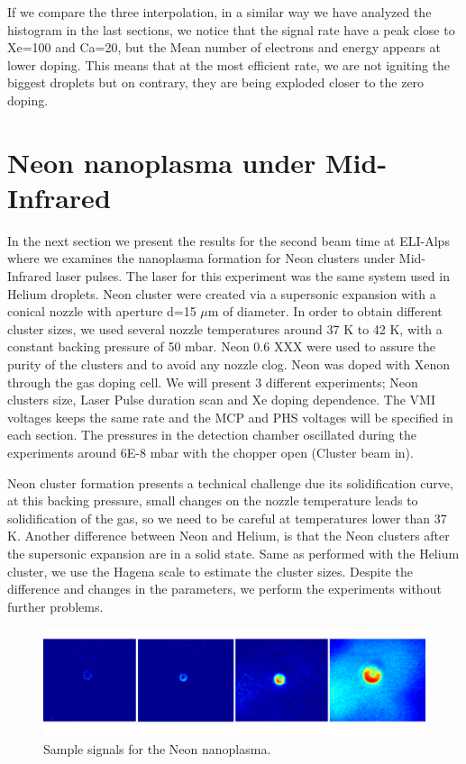 If we compare the three interpolation, in a similar way we have analyzed the histogram in the last sections, we notice that the signal rate have a peak close to Xe=100 and Ca=20, but the Mean number of electrons and energy appears at lower doping. This means that at the most efficient rate, we are not igniting the biggest droplets but on contrary, they are being exploded closer to the zero doping.


\section{Neon nanoplasma under Mid-Infrared}

In the next section we present the results for the second beam time at ELI-Alps where we examines the nanoplasma formation for Neon clusters under Mid-Infrared laser pulses. The laser for this experiment was the same system used in Helium droplets. Neon cluster were created via a supersonic expansion with a conical nozzle with aperture d=15 $\mu$m of diameter. In order to obtain different cluster sizes, we used several nozzle temperatures around 37 K to 42 K, with a constant backing pressure of 50 mbar. Neon 0.6 XXX were used to assure the purity of the clusters and to avoid any nozzle clog. Neon was doped with Xenon through the gas doping cell. We will present 3 different experiments; Neon clusters size, Laser Pulse duration scan and Xe doping dependence. The VMI voltages keeps the same rate and the MCP and PHS voltages will be specified in each section. The pressures in the detection chamber oscillated during the experiments around 6E-8 mbar with the chopper open (Cluster beam in).  

Neon cluster formation presents a technical challenge due its solidification curve, at this backing pressure, small changes on the nozzle temperature leads to solidification of the gas, so we need to be careful at temperatures lower than 37 K. Another difference between Neon and Helium, is that the Neon clusters after the supersonic expansion are in a solid state. Same as performed with the Helium cluster, we use the Hagena scale to estimate the cluster sizes. Despite the difference and changes in the parameters, we perform the experiments without further problems.

\begin{figure}[h!]
\centering
\includegraphics[width=1\textwidth]{../Images/Raw MIR NEon samples.png}
\caption[MIR Neon raw samples]{Sample signals for the Neon nanoplasma. }
\label{fig:neonrwasample}
\end{figure}

